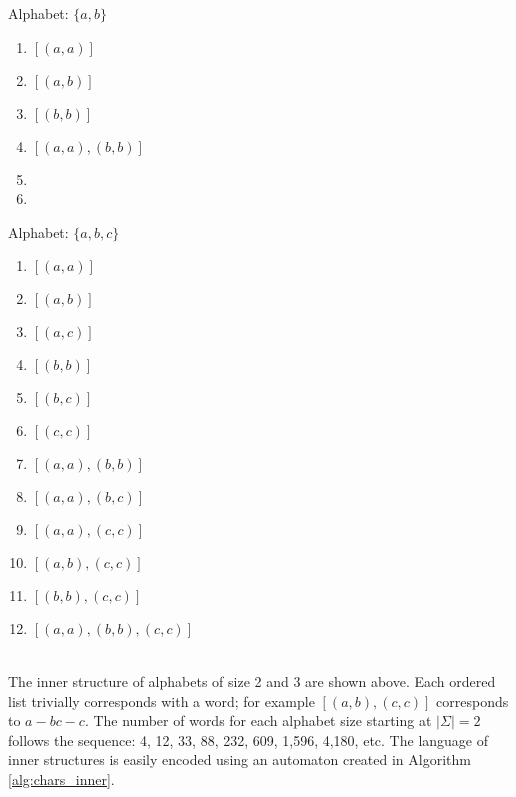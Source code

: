 {\singlespacing
  \begin{minipage}[t]{0.45\textwidth}
    \begin{center}
      Alphabet: $\{a,b\}$
    \end{center}
    \begin{enumerate}
      \item $[(a,a)]$
      \item $[(a,b)]$
      \item $[(b,b)]$
      \item $[(a,a), (b,b)]$
      \item []
      \item []
    \end{enumerate}
  \end{minipage}
  \begin{minipage}[t]{0.45\textwidth}    
    \begin{center}
      Alphabet: $\{a,b,c\}$
    \end{center}
    \begin{multicols}{2}
      \begin{enumerate}
        \item $[(a,a)]$
        \item $[(a,b)]$
        \item $[(a,c)]$
        \item $[(b,b)]$
        \item $[(b,c)]$
        \item $[(c,c)]$
        \columnbreak
        \item $[(a,a), (b,b)]$
        \item $[(a,a), (b,c)]$
        \item $[(a,a), (c,c)]$
        \item $[(a,b), (c,c)]$
        \item $[(b,b), (c,c)]$
        \item $[(a,a), (b,b), (c,c)]$
      \end{enumerate}
    \end{multicols}
  \end{minipage}
}
\\

The inner structure of alphabets of size 2 and 3 are shown above. Each ordered list trivially corresponds with a word; for example $[(a,b), (c,c)]$ corresponds to $a-bc-c$. The number of words for each alphabet size starting at $|\Sigma|=2$ follows the sequence: 4, 12, 33, 88, 232, 609, 1,596, 4,180, etc. The language of inner structures is easily encoded using an automaton created in Algorithm \ref{alg:chars_inner}.

